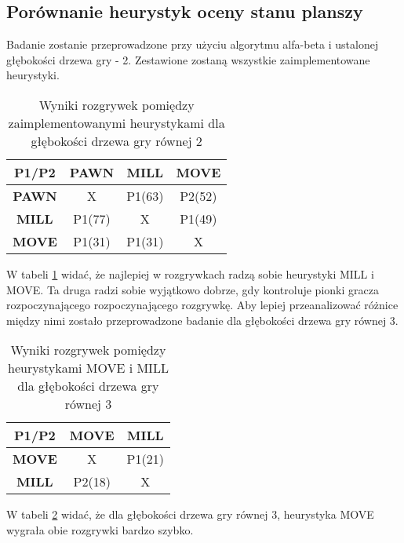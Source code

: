 \documentclass{article}
\begin{document}
	\subsection{Porównanie heurystyk oceny stanu planszy}
	Badanie zostanie przeprowadzone przy użyciu algorytmu alfa-beta i ustalonej głębokości drzewa gry - 2. Zestawione zostaną wszystkie zaimplementowane heurystyki.
	\begin{table}[H]
		\centering
		\label{tab:heuristics2}
		\caption{Wyniki rozgrywek pomiędzy zaimplementowanymi heurystykami dla głębokości drzewa gry równej 2}
		\begin{tabular}{|c|c|c|c|}
			\hline
			\textbf{P1/P2} & \textbf{PAWN} & \textbf{MILL} & \textbf{MOVE} \\ \hline
			\textbf{PAWN}  & X             & P1(63)        & P2(52)        \\ \hline
			\textbf{MILL}  & P1(77)        & X             & P1(49)        \\ \hline
			\textbf{MOVE}  & P1(31)        & P1(31)        & X            \\ \hline
		\end{tabular}
	\end{table}
	W tabeli \ref{tab:heuristics2} widać, że najlepiej w rozgrywkach radzą sobie heurystyki MILL i MOVE. Ta druga radzi sobie wyjątkowo dobrze, gdy kontroluje pionki gracza rozpoczynającego rozpoczynającego rozgrywkę. Aby lepiej przeanalizować różnice między nimi zostało przeprowadzone badanie dla głębokości drzewa gry równej 3.
	\begin{table}[H]
		\centering
		\label{tab:heuristics3}
		\caption{Wyniki rozgrywek pomiędzy heurystykami MOVE i MILL dla głębokości drzewa gry równej 3}
		\begin{tabular}{|c|c|c|}
			\hline
			\textbf{P1/P2} & \textbf{MOVE} & \textbf{MILL} \\ \hline
			\textbf{MOVE}  & X             & P1(21)        \\ \hline
			\textbf{MILL}  & P2(18)        & X             \\ \hline
		\end{tabular}
	\end{table}
	W tabeli \ref{tab:heuristics3} widać, że dla głębokości drzewa gry równej 3, heurystyka MOVE wygrała obie rozgrywki bardzo szybko.
	
\end{document}
